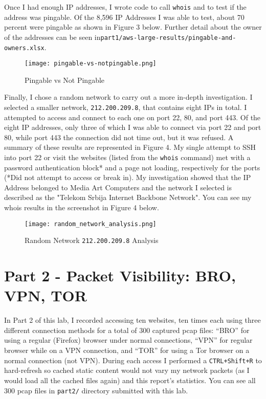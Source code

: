 \documentclass[11pt]{article}
\def\code#1{\texttt{#1}}
\begin{document}
Once I had enough IP addresses, I wrote code to call \code{whois} and to test if the address was pingable. Of the 8,596 IP Addresses I was able to test, about 70 percent were pingable as shown in Figure 3 below. Further detail about the owner of the addresses can be seen in\newline \code{part1/aws-large-results/pingable-and-owners.xlsx}.

\begin{figure}[H]
\centering
\texttt{[image: pingable-vs-notpingable.png]}
\caption{Pingable vs Not Pingable}
\end{figure}

Finally, I chose a random network to carry out a more in-depth investigation. I selected a smaller network, \code{212.200.209.8}, that contains eight IPs in total. I attempted to access and connect to each one on port 22, 80, and port 443. Of the eight IP addresses, only three of which I was able to connect via port 22 and port 80, while port 443 the connection did not time out, but it was refused. A summary of these results are represented in Figure 4. My single attempt to SSH into port 22 or visit the websites (listed from the \code{whois} command) met with a password authentication block* and a page not loading, respectively for the ports (*Did not attempt to access or break in). My investigation showed that the IP Address belonged to  Media Art Computers and the network I selected is described as the "Telekom Srbija Internet Backbone Network". You can see my whois results in the screenshot in Figure 4 below.


\begin{figure}[H]
\centering
\texttt{[image: random\_network\_analysis.png]}
\caption{Random Network \code{212.200.209.8} Analysis}
\end{figure}


\section{Part 2 - Packet Visibility: BRO, VPN, TOR}
\label{sec:question-2}

In Part 2 of this lab, I recorded accessing ten websites, ten times each using three different connection methods for a total of 300 captured pcap files: “BRO” for using a  regular (Firefox) browser under normal connections, “VPN” for regular browser while on a VPN connection, and “TOR” for using a Tor browser on a normal connection (not VPN). During each access I performed a \code{CTRL+Shift+R} to hard-refresh so cached static content would not vary my network packets (as I would load all the cached files again) and this report's statistics. You can see all 300 pcap files in \code{part2/} directory submitted with this lab.
\end{document}
